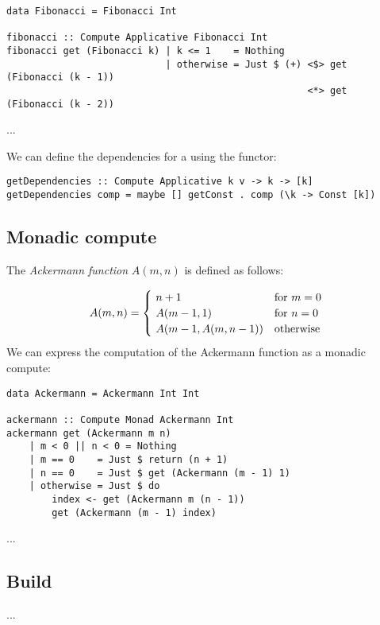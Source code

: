 \begin{verbatim}
data Fibonacci = Fibonacci Int

fibonacci :: Compute Applicative Fibonacci Int
fibonacci get (Fibonacci k) | k <= 1    = Nothing
                            | otherwise = Just $ (+) <$> get (Fibonacci (k - 1))
                                                     <*> get (Fibonacci (k - 2))
\end{verbatim}

...

\label{getdependencies} We can define the dependencies for a  using the  functor:

\begin{verbatim}
getDependencies :: Compute Applicative k v -> k -> [k]
getDependencies comp = maybe [] getConst . comp (\k -> Const [k])
\end{verbatim}

\subsection{Monadic compute}\label{sec-compute-monad}

The \emph{Ackermann function} $A(m, n)$ is defined as follows:

\[
A(m, n) = {\begin{cases}~n+1&{\text{for }}m=0\\~A(m-1, 1)&{\text{for }}n=0\\~A(m-1,A(m,n-1))&{\text{otherwise}}\end{cases}}
\vspace{2mm}
\]
\noindent
We can express the computation of the Ackermann function as a monadic compute:

\begin{verbatim}
data Ackermann = Ackermann Int Int

ackermann :: Compute Monad Ackermann Int
ackermann get (Ackermann m n)
    | m < 0 || n < 0 = Nothing
    | m == 0    = Just $ return (n + 1)
    | n == 0    = Just $ get (Ackermann (m - 1) 1)
    | otherwise = Just $ do
        index <- get (Ackermann m (n - 1))
        get (Ackermann (m - 1) index)
\end{verbatim}

...

\subsection{Build}\label{sec-general-build}

...
